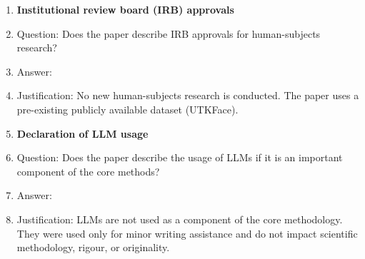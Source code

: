 \begin{enumerate}
\item {\bf Institutional review board (IRB) approvals}
    \item[] Question: Does the paper describe IRB approvals for human-subjects research?
    \item[] Answer: \answerNA{}
    \item[] Justification: No new human-subjects research is conducted. The paper uses a pre-existing publicly available dataset (UTKFace).

\item {\bf Declaration of LLM usage}
    \item[] Question: Does the paper describe the usage of LLMs if it is an important component of the core methods?
    \item[] Answer: \answerNA{}
    \item[] Justification: LLMs are not used as a component of the core methodology. They were used only for minor writing assistance and do not impact scientific methodology, rigour, or originality.

\end{enumerate}
